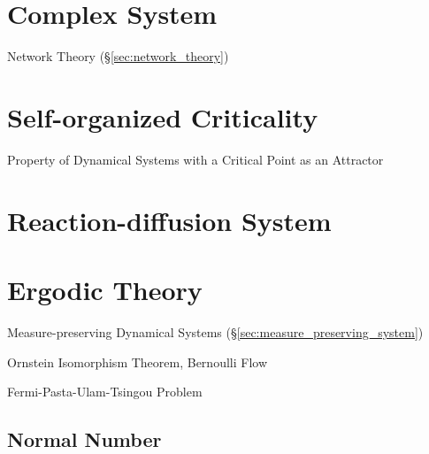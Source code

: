 \section{Complex System}\label{sec:complex_system}

Network Theory (\S\ref{sec:network_theory})



\section{Self-organized Criticality}\label{sec:self_organized_criticality}

Property of Dynamical Systems with a Critical Point as an Attractor




\section{Reaction-diffusion System}\label{sec:reaction_diffusion}

\section{Ergodic Theory}\label{sec:ergodic_theory}

\fist Measure-preserving Dynamical Systems
(\S\ref{sec:measure_preserving_system})

Ornstein Isomorphism Theorem, Bernoulli Flow

Fermi-Pasta-Ulam-Tsingou Problem



\subsection{Normal Number}\label{sec:normal_number}

